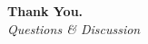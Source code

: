 \documentclass[aspectratio=169]{beamer}
\begin{document}
\begin{frame}[c] %
  \begin{center}
      \Huge \textbf{Thank You.} \\[0.5cm]
      \Large \textit{Questions \& Discussion}
  \end{center}
\end{frame}
\end{document}
